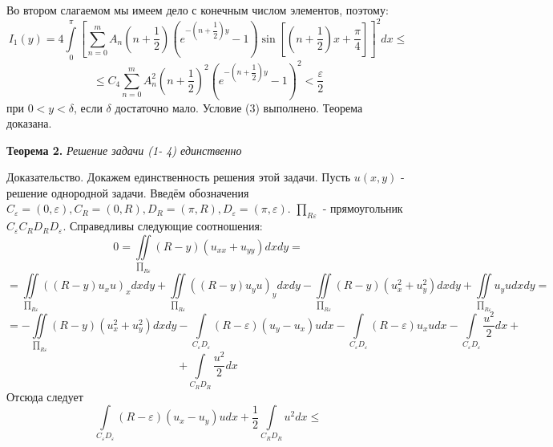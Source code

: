 \documentclass[a4paper, 9pt]{article}
\begin{document}
	Во втором слагаемом мы имеем дело с конечным числом элементов, поэтому:
	\begin{equation*}
		I_1(y) = 4\int\limits_0^\pi \left[	\sum\limits_{n=0}^{m} A_n\left(n+\dfrac12\right) \left( e^{-\left(n+\dfrac12\right)y} - 1\right) \sin{\left[\left(n+\dfrac12\right) x  + \dfrac\pi4\right]} \right]^2 dx \leq
	\end{equation*}
	\begin{equation*}
		\leq C_4 \sum\limits_{n=0}^{m} A_n^2 \left(n +\dfrac12\right)^2 \left(e^{-\left(n+\dfrac12\right)y} - 1\right)^2 < \dfrac{\varepsilon}{2}
	\end{equation*}
	при $0 < y < \delta$, если $\delta$ достаточно мало. Условие (3) выполнено. Теорема доказана.
	\par
		\textbf{Теорема 2.} \textit{Решение задачи (1- 4) единственно}
	\par
		Доказательство. Докажем единственность решения этой задачи. Пусть $u(x,y)$ - решение однородной задачи.
		Введём обозначения $C_\varepsilon = (0, \varepsilon), C_R = (0, R), D_R = (\pi, R), D_\varepsilon = (\pi, \varepsilon)$. $\prod_{R\varepsilon}$ - прямоугольник $C_\varepsilon C_R D_R D_\varepsilon$. Справедливы следующие соотношения:
		\begin{equation*}
			0 = \iint\limits_{\prod_{R\varepsilon}} (R-y) (u_{xx} + u_{yy}) dx dy = 
		\end{equation*}
		\begin{equation*}
			=	\iint\limits_{\prod_{R\varepsilon}} \left( \left(R - y\right) u_x u\right)_x dx dy  + \iint\limits_{\prod_{R\varepsilon}} \left( \left(R - y\right) u_y u\right)_y dx dy  
			- \iint\limits_{\prod_{R\varepsilon}} \left(R- y\right) \left(u_x^2 + u_y^2\right)dxdy + \iint\limits_{\prod_{R\varepsilon}} u_y u dx dy = 
		\end{equation*}
		\begin{equation*}
			= - \iint\limits_{\prod_{R\varepsilon}} \left(R - y\right) \left(u_x^2 + u_y^2\right) dx dy - 
			\int\limits_{C_\varepsilon D_\varepsilon} \left(R - \varepsilon \right) \left(u_y - u_x\right)u dx - \int\limits_{C_\varepsilon D_\varepsilon} \left(R - \varepsilon\right) u_x u dx - \int\limits_{C_\varepsilon D_\varepsilon}\dfrac{u^2}{2} dx +
		\end{equation*}
		\begin{equation*}
			+ \int\limits_{C_R D_R} \dfrac{u^2}{2}dx
		\end{equation*}
		Отсюда следует
		\begin{equation*}
			\int\limits_{C_\varepsilon D_\varepsilon} \left(R - \varepsilon \right) \left(u_x - u_y\right)u dx + \dfrac12  \int\limits_{C_R D_R} u^2 dx \leq
		\end{equation*}
\end{document}
